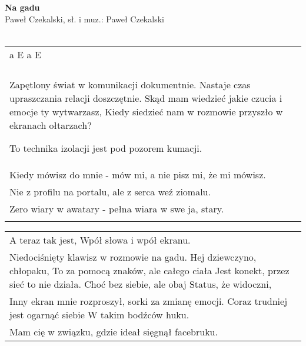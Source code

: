 \documentclass[a5paper]{article}
\begin{document}


\noindent
\fontsize{12pt}{15pt}\selectfont
\textbf{Na gadu} \\
\fontsize{8pt}{10pt}\selectfont
Paweł Czekalski, sł. i muz.: Paweł Czekalski \\ \\
\fontsize{10pt}{12pt}\selectfont
{}
\begin{tabular}{@{}p{12cm}@{}}
\noindent
a E a E \\ \\
Zapętlony świat w komunikacji dokumentnie. %
Nastaje czas upraszczania relacji doszczętnie. %
Skąd mam wiedzieć jakie czucia i emocje ty wytwarzasz, %
Kiedy siedzieć nam w rozmowie przyszło w ekranach ołtarzach? %

To technika izolacji jest pod pozorem kumacji. \\
Kiedy mówisz do mnie - mów mi, a nie pisz mi, że mi mówisz. \\
Nie z profilu na portalu, ale z serca weź ziomalu. \\
Zero wiary w awatary - pełna wiara w swe ja, stary. \\ \\
\end{tabular}

\noindent
\begin{tabular}{@{}p{12cm}@{}}
A teraz tak jest, %
Wpół słowa i wpół ekranu. \\
Niedociśnięty klawisz w rozmowie na gadu. %
Hej dziewczyno, chłopaku, %
To za pomocą znaków, ale całego ciała %
Jest konekt, przez sieć to nie działa. %
Choć bez siebie, ale obaj %
Status, że widoczni, \\
Inny ekran mnie rozproszył, sorki za zmianę emocji. %
Coraz trudniej jest ogarnąć siebie %
W takim bodźców huku. \\
Mam cię w związku, gdzie ideał sięgnął facebruku. %
\end{tabular}
\end{document}

